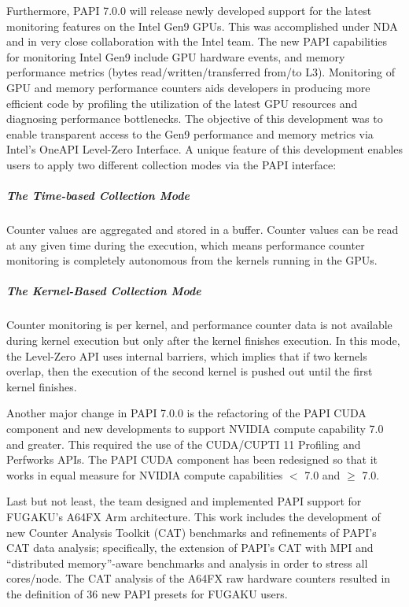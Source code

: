 \vspace{10pt}
Furthermore, PAPI 7.0.0 will release newly developed support for the latest monitoring
features on the Intel Gen9 GPUs. 
This was accomplished under NDA and in very close collaboration with the Intel team. 
The new PAPI capabilities for monitoring Intel Gen9 include GPU hardware 
events, and memory performance metrics (bytes read/written/transferred from/to L3).
Monitoring of GPU and memory performance counters aids developers in producing
more efficient code by profiling the utilization of the latest GPU resources and
diagnosing performance bottlenecks.
The objective of this development was to  
enable transparent access
to the Gen9 performance and memory metrics via Intel's OneAPI Level-Zero Interface.
A unique feature of this development enables users to apply two different collection modes 
via the PAPI interface:

\subparagraph{The Time-based Collection Mode}
Counter values are aggregated and stored in a buffer.
Counter values can be read at any given time during the execution, which means
performance counter monitoring is completely autonomous from the kernels
running in the GPUs.

\subparagraph{The Kernel-Based Collection Mode}
Counter monitoring is per kernel, and
performance counter data is not available during kernel execution but only after
the kernel finishes execution.
In this mode, the Level-Zero API uses internal barriers, which implies that if two
kernels overlap, then the execution of the second kernel is pushed out until the first
kernel finishes.


\vspace{10pt}
Another major change in PAPI 7.0.0 is the refactoring of the PAPI CUDA component and 
new developments to support NVIDIA compute capability 7.0 and greater. This required
the use of the CUDA/CUPTI 11 Profiling and Perfworks APIs. The PAPI CUDA component 
has been redesigned so that it works in equal measure for NVIDIA compute capabilities 
$<$ 7.0 and $\geq$ 7.0. 
 
 
 \vspace{10pt}
Last but not least, the team designed and implemented PAPI support for FUGAKU's A64FX 
Arm architecture. This work includes the development of new Counter Analysis Toolkit (CAT) 
benchmarks and refinements of PAPI's CAT data analysis; specifically, the extension of 
PAPI's CAT with MPI and ``distributed memory''-aware benchmarks and analysis in order to 
stress all cores/node. The CAT analysis of the A64FX raw hardware counters resulted in the 
definition of 36 new PAPI presets for FUGAKU users.
 
